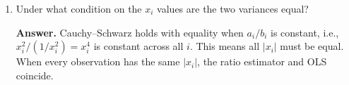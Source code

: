 \documentclass{article}
\begin{document}
\begin{enumerate}
\begin{enumerate}
  \item Under what condition on the $x_i$ values are the two variances equal?

  \textbf{Answer.} Cauchy--Schwarz holds with equality when $a_i/b_i$ is constant, i.e., $x_i^2/(1/x_i^2) = x_i^4$ is constant across all $i$.  This means all $|x_i|$ must be equal.  When every observation has the same $|x_i|$, the ratio estimator and OLS coincide.
\end{enumerate}

\end{enumerate}
\end{document}
